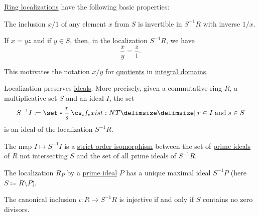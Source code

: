 \begin{proposition}\label{thm:def:ring_localization}
  \hyperref[def:ring_localization]{Ring localizations} have the following basic properties:

  \begin{thmenum}
     The inclusion \( x / 1 \) of any element \( x \) from \( S \) is invertible in \( S^{-1} R \) with inverse \( 1 / x \).

     If \( x = yz \) and if \( y \in S \), then, in the localization \( S^{-1} R \), we have
    \begin{equation*}
      \frac x y = \frac z 1.
    \end{equation*}

    This motivates the notation \( x / y \) for \hyperref[def:domain_quotient]{quotients} in \hyperref[def:integral_domain]{integral domains}.

     Localization preserves \hyperref[def:semiring_ideal]{ideals}. More precisely, given a commutative ring \( R \), a multiplicative set \( S \) and an ideal \( I \), the set
    \begin{equation*}
      S^{-1} I \coloneqq \set*{ \frac r s \given* r \in I \T{and} s \in S }
    \end{equation*}
    is an ideal of the localization \( S^{-1} R \).

     The map \( I \mapsto S^{-1} I \) is a \hyperref[def:preordered_set/homomorphism]{strict order isomorphism} between the set of \hyperref[def:ring/submodel]{prime ideals} of \( R \) not intersecting \( S \) and the set of all prime ideals of \( S^{-1} R \).

     The localization \( R_P \) by a \hyperref[def:semiring_ideal/prime]{prime ideal} \( P \) has a unique maximal ideal \( S^{-1} P \) (here \( S \coloneqq R \setminus P \)).

     The canonical inclusion \( \iota: R \to S^{-1} R \) is injective if and only if \( S \) contains no zero divisors.
  \end{thmenum}
\end{proposition}

